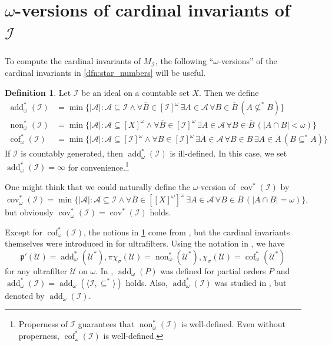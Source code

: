 \documentclass[a4paper,12pt]{amsart}
\theoremstyle{definition}
\newtheorem{dfn}[thm]{Definition}
\numberwithin{thm}{section}
\numberwithin{equation}{section}
\DeclareMathOperator{\non}{non}
\DeclareMathOperator{\cov}{cov}
\DeclareMathOperator{\add}{add}
\DeclareMathOperator{\cof}{cof}
\newcommand{\I}{\mathscr{I}}
\renewcommand{\subset}{\subseteq}
\begin{document}
    \section{$\omega$-versions of cardinal invariants of $\I$}\label{sec:omega}

    To compute the cardinal invariants of $M_\I$, the following ``$\omega$-versions'' of the cardinal invariants in \cref{dfn:star_numbers} will be useful.

    \begin{dfn}\label{dfn:omega_star_numbers}
        Let $\I$ be an ideal on a countable set $X$. Then we define
        \begin{align*}
            \add^*_\omega(\I) &= \min\{\lvert\mathcal{A}\rvert:\mathcal{A}\subset\I\land\forall\overline{B}\in[\I]^\omega\,\exists A\in\mathcal{A}\,\forall B\in\overline{B}\, (A \not\subset^* B)\}\\
            \non^*_\omega(\I) &= \min\{\lvert\mathcal{A}\rvert:\mathcal{A}\subset[X]^\omega\land\forall\overline{B}\in[\I]^\omega\,\exists A\in\mathcal{A}\,\forall B\in\overline{B}\, (\lvert A \cap B \rvert<\omega)\}\\
            \cof^*_\omega(\I) &= \min\{\lvert\mathcal{A}\rvert:\mathcal{A}\subset[\I]^\omega\land\forall\overline{B}\in[\I]^\omega\,\exists\overline{A}\in\mathcal{A}\,\forall B\in\overline{B}\,\exists A\in\overline{A}\, (B \subset^* A)\}
        \end{align*}
        If $\I$ is countably generated, then $\add^*_\omega(\I)$ is ill-defined. In this case, we set $\add^*_\omega(\I) = \infty$ for convenience.\footnote{Properness of $\I$ guarantees that $\non^*_\omega(\I)$ is well-defined. Even without properness, $\cof^*_\omega(\I)$ is well-defined.}
    \end{dfn}
    
    One might think that we could naturally define the $\omega$-version of $\cov^*(\I)$ by
    \[
    \cov^*_\omega(\I) = \min\{\lvert\mathcal{A}\rvert:\mathcal{A}\subset\I\land\forall\overline{B}\in[[X]^\omega]^\omega\,\exists A\in\mathcal{A}\,\forall B\in\overline{B}\,(\lvert A\cap B\rvert = \omega)\},
    \]
    but obviously $\cov^*_\omega(\I) = \cov^*(\I)$ holds.

    Except for $\cof^*_\omega(\I)$, the notions in \cref{dfn:omega_star_numbers} come from \cite{CM25}, but the cardinal invariants themselves were introduced in \cite{BS99} for ultrafilters. Using the notation in \cite{BS99}, we have
    \[
    \mathfrak{p}'(\mathcal{U}) = \add^*_\omega(\mathcal{U}^*), \pi\chi_\sigma(\mathcal{U}) = \non^*_\omega(\mathcal{U}^*), \chi_\sigma(\mathcal{U}) = \cof^*_\omega(\mathcal{U}^*)
    \]
    for any ultrafilter $\mathcal{U}$ on $\omega$. In \cite{LV99}, $\add_\omega(P)$ was defined for partial orders $P$ and $\add^*_\omega(\I) = \add_\omega(\langle\mathcal{I}, \subset^*\rangle)$ holds. Also, $\add^*_\omega(\I)$ was studied in \cite{FK25}, but denoted by $\add_\omega(\I)$.
\end{document}
